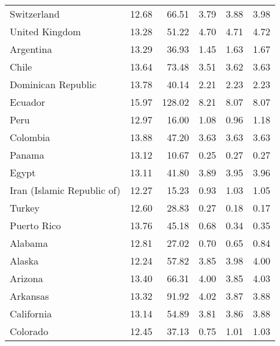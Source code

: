\begin{longtable}{lrrrrr}
                Switzerland &      12.68 &     66.51 &       3.79 &        3.88 &         3.98 \\
             United Kingdom &      13.28 &     51.22 &       4.70 &        4.71 &         4.72 \\
                  Argentina &      13.29 &     36.93 &       1.45 &        1.63 &         1.67 \\
                      Chile &      13.64 &     73.48 &       3.51 &        3.62 &         3.63 \\
         Dominican Republic &      13.78 &     40.14 &       2.21 &        2.23 &         2.23 \\
                    Ecuador &      15.97 &    128.02 &       8.21 &        8.07 &         8.07 \\
                       Peru &      12.97 &     16.00 &       1.08 &        0.96 &         1.18 \\
                   Colombia &      13.88 &     47.20 &       3.63 &        3.63 &         3.63 \\
                     Panama &      13.12 &     10.67 &       0.25 &        0.27 &         0.27 \\
                      Egypt &      13.11 &     41.80 &       3.89 &        3.95 &         3.96 \\
 Iran (Islamic Republic of) &      12.27 &     15.23 &       0.93 &        1.03 &         1.05 \\
                     Turkey &      12.60 &     28.83 &       0.27 &        0.18 &         0.17 \\
                Puerto Rico &      13.76 &     45.18 &       0.68 &        0.34 &         0.35 \\
                    Alabama &      12.81 &     27.02 &       0.70 &        0.65 &         0.84 \\
                     Alaska &      12.24 &     57.82 &       3.85 &        3.98 &         4.00 \\
                    Arizona &      13.40 &     66.31 &       4.00 &        3.85 &         4.03 \\
                   Arkansas &      13.32 &     91.92 &       4.02 &        3.87 &         3.88 \\
                 California &      13.14 &     54.89 &       3.81 &        3.86 &         3.88 \\
                   Colorado &      12.45 &     37.13 &       0.75 &        1.01 &         1.03 \\

\end{longtable}
